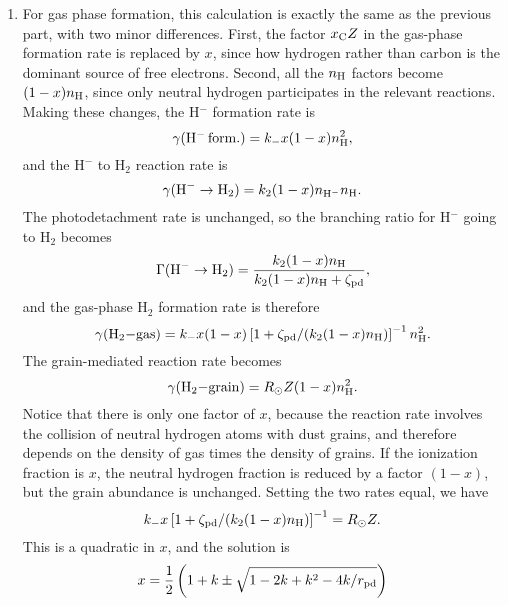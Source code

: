 \begin{enumerate}
\begin{enumerate}
\item For gas phase formation, this calculation is exactly the same as the previous part, with two minor differences. First, the factor $x_{\rm C} Z$ in the gas-phase formation rate is replaced by $x$, since how hydrogen rather than carbon is the dominant source of free electrons. Second, all the $n_{\rm H}$ factors become $(1-x) n_{\rm H}$, since only neutral hydrogen participates in the relevant reactions. Making these changes, the H$^-$ formation rate is
\begin{displaymath}
\gamma({\rm H}^{-}\,{\rm form.}) = k_{-} x (1-x) n_{\rm H}^2,
\end{displaymath}
and the H$^-$ to H$_2$ reaction rate is
\begin{displaymath}
\gamma({\rm H}^{-}\rightarrow{\rm H}_2) = k_2 (1-x) n_{{\rm H}^-} n_{\rm H}.
\end{displaymath}
The photodetachment rate is unchanged, so the branching ratio for H$^-$ going to H$_2$ becomes
\begin{displaymath}
\Gamma({\rm H}^{-}\rightarrow{\rm H}_2) = \frac{k_2 (1-x) n_{\rm H}}{k_2 (1-x) n_{\rm H}+\zeta_{\rm pd}},
\end{displaymath}
and the gas-phase H$_2$ formation rate is therefore
\begin{displaymath}
\gamma({\rm H}_2{\rm - gas}) = k_{-} x (1-x)  \left[1+ \zeta_{\rm pd}/(k_2 (1-x) n_{\rm H})\right]^{-1} n_{\rm H}^2. 
\end{displaymath}
The grain-mediated reaction rate becomes
\begin{displaymath}
\gamma({\rm H}_2{\rm - grain}) = R_{\odot} Z (1-x) n_{\rm H}^2.
\end{displaymath}
Notice that there is only one factor of $x$, because the reaction rate involves the collision of neutral hydrogen atoms with dust grains, and therefore depends on the density of gas times the density of grains. If the ionization fraction is $x$, the neutral hydrogen fraction is reduced by a factor $(1-x)$, but the grain abundance is unchanged. Setting the two rates equal, we have
\begin{displaymath}
k_{-} x \left[1+ \zeta_{\rm pd}/(k_2 (1-x) n_{\rm H})\right]^{-1} = R_{\odot} Z.
\end{displaymath}
This is a quadratic in $x$, and the solution is
\begin{displaymath}
x = \frac{1}{2}\left(1+k \pm \sqrt{1-2k + k^2 - 4 k/r_{\rm pd}}\right)
\end{displaymath}
\begin{marginfigure}

\end{marginfigure}
\end{enumerate}
\end{enumerate}
